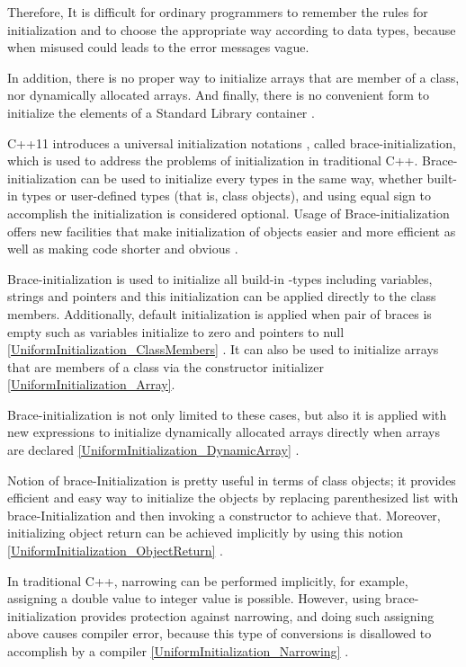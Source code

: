 \documentclass[11pt]{report}
\begin{document}
Therefore, It is difficult for ordinary programmers to remember the rules for initialization and to choose the appropriate way according to data types, because when misused could leads to the error messages vague.


In addition, there is no proper way to initialize arrays that are member of a class, nor dynamically allocated arrays. And finally, there is no convenient form to initialize the elements of a Standard Library container \cite{Stroustrup:2012:Cpp11}.


C++11 introduces a universal initialization notations { }, called brace-initialization, which is used to address the problems of initialization in traditional C++. Brace-initialization can be used to initialize every types in the same way, whether built-in types or user-defined types (that is, class objects), and using equal sign to accomplish the initialization is considered optional. Usage of Brace-initialization offers new facilities that make initialization of objects easier and more efficient as well as making code shorter and obvious \cite{Reddy:2011:API}.


Brace-initialization is used to initialize all build-in -types including variables, strings and pointers and this initialization can be applied directly to the class members. Additionally, default initialization is applied when pair of braces is empty such as variables initialize to zero and pointers to null \ref{UniformInitialization_ClassMembers} \cite{Reddy:2011:API}. It can also be used to initialize arrays that are members of a class via the constructor initializer \ref{UniformInitialization_Array}.


Brace-initialization is not only limited to these cases, but also it is applied with new expressions to initialize dynamically allocated arrays directly when arrays are declared \ref{UniformInitialization_DynamicArray} \cite{Reddy:2011:API}.

Notion of brace-Initialization is pretty useful in terms of class objects; it provides efficient and easy way to initialize the objects by replacing parenthesized list with brace-Initialization and then invoking a constructor to achieve that. Moreover, initializing object return can be achieved implicitly by using this notion \ref{UniformInitialization_ObjectReturn} \cite{Gregorie:professionalcpp}.


In traditional C++, narrowing can be performed implicitly, for example, assigning a double value to integer value is possible. However, using brace- initialization provides protection against narrowing, and doing such assigning above causes compiler error, because this type of conversions is disallowed to accomplish by a compiler \ref{UniformInitialization_Narrowing} \cite{Gregorie:professionalcpp}.
\end{document}
